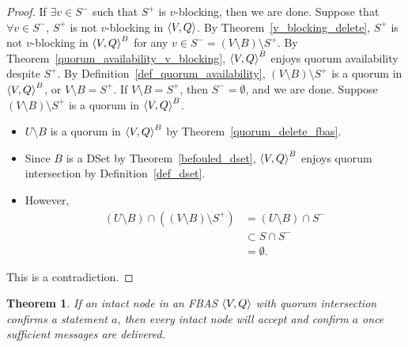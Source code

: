 \documentclass[12pt, psamsfonts]{amsart}
\newtheorem{thm}{Theorem}[section]
\theoremstyle{definition}
\theoremstyle{remark}
\numberwithin{equation}{section}
\begin{document}
\begin{proof}
    If $\exists v \in S^{-}$ such that $S^{+}$ is $v$-blocking, then we are done.
    Suppose that $\forall v \in S^{-}$, $S^{+}$ is not $v$-blocking in $\ev{V, Q}$.
    By Theorem~\ref{v_blocking_delete}, $S^{+}$ is not $v$-blocking in $\ev{V, Q}^B$ for any $v \in S^{-} = (V \setminus B) \setminus S^{+}$.
    By Theorem~\ref{quorum_availability_v_blocking}, $\ev{V, Q}^B$ enjoys quorum availability despite $S^{+}$.
    By Definition~\ref{def_quorum_availability}, $(V \setminus B) \setminus S^{+}$ is a quorum in $\ev{V, Q}^B$, or $V \setminus B = S^{+}$.
    If $V \setminus B = S^{+}$, then $S^{-} = \emptyset$, and we are done.
    Suppose $(V \setminus B) \setminus S^{+}$ is a quorum in $\ev{V, Q}^B$.
    \begin{itemize}
        \item
            $U \setminus B$ is a quorum in $\ev{V, Q}^B$ by Theorem~\ref{quorum_delete_fbas}.
        \item
            Since $B$ is a DSet by Theorem~\ref{befouled_dset}, $\ev{V, Q}^B$ enjoys quorum intersection by Definition~\ref{def_dset}.
        \item
            However,
            \begin{align*}
                (U \setminus B) \cap ((V \setminus B) \setminus S^{+})
                    &= (U \setminus B) \cap S^{-} \\
                    &\subset S \cap S^{-} \\
                    &= \emptyset.
            \end{align*}
    \end{itemize}
    This is a contradiction.
\end{proof}

\begin{thm}
    If an intact node in an FBAS $\ev{V, Q}$ with quorum intersection confirms a statement $a$, then every intact node will accept and confirm $a$ once sufficient messages are delivered.
\end{thm}
\end{document}
